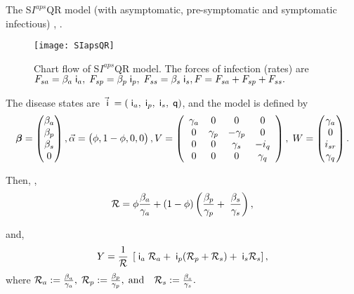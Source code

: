 \beXa The S$I^{aps}$QR model (with asymptomatic, pre-symptomatic and  symptomatic infectious)  \cite[(3.2)]{shaw2021reproductive}, \cite{Hadany}.

\begin{figure}[H]
\centering
\texttt{[image: SIapsQR]}
\caption{Chart flow of S$I^{aps}$QR model.  The forces of infection (rates) are $F_{sa}= \beta_a \;\mathsf i_a,\; F_{sp}= \beta_p \;\mathsf i_p,\; F_{ss}= \beta_s \;\mathsf i_s  , F=F_{sa}+F_{sp} + F_{ss}.$\label{f:SIapsQR}}
\end{figure}

The disease states are $\vec {\;\mathsf i} \;  =(\;\mathsf i_a , \;\mathsf i_p, \;\mathsf i_s,\; \mathsf q)$, and the model is defined by
 $${\mbox{\boldmath$\beta$}}=\begin{pmatrix} \beta_a\\\beta_p\\\beta_s\\0\end{pmatrix}, \vec \alpha=\begin{pmatrix} \phi,1-\phi,0,0\end{pmatrix}, V=
\left(
\begin{array}{cccc}
 \gamma _a & 0 & 0 & 0 \\
 0 & \gamma _p & -\gamma_p & 0 \\
 0 & 0 & \gamma _s & -i_q \\
 0 & 0 & 0 & \gamma _q \\
\end{array}
\right),\; W =\begin{pmatrix} \gamma_{a}\\ 0\\ i_{sr} \\ \gamma_{q} \end{pmatrix}.$$

Then, \cite{shaw2021reproductive}, $$\mathcal R= \phi \frac{\beta_a}{\gamma_a}+ (1-\phi)\left( \frac{\beta_p}{\gamma_p}+ \; \frac{\beta_s}{\gamma_s}\right),$$


and, $$Y= \frac{1}{\mathcal R} \; \left[\;\mathsf i_a \; \mathcal R_a + \;\mathsf i_p(\mathcal R_p +\mathcal R_s) + \;\mathsf i_s \mathcal R_s  \right], $$
 where $\mathcal R_a:= \frac{\beta_a}{\gamma_a}, \; \mathcal R_p:= \frac{\beta_p}{\gamma_p}, \; \mbox{and} \quad \mathcal R_s:= \frac{\beta_s}{\gamma_s}.$

\eeXa
